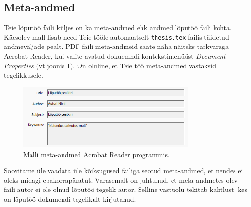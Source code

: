 \subsection{Meta-andmed}
Teie lõputöö faili küljes on ka meta-andmed ehk andmed lõputöö faili kohta. Käesolev mall lisab need Teie tööle automaatselt \verb|thesis.tex| failis täidetud andmeväljade pealt. PDF faili meta-andmeid saate näha näiteks tarkvaraga Acrobat Reader, kui valite avatud dokuemndi kontekstimenüüst \emph{Document Properties} (vt joonis \ref{fig:metaAndmed}). On oluline, et Teie töö meta-andmed vastaksid tegelikkusele.

\begin{figure}[htb!]
    \centering
    \captionsetup{justification=centering}
    \includegraphics[width=0.8\textwidth]{figures/Joonis4-MetaAndmed.png}
    \caption{Malli meta-andmed Acrobat Reader programmis.}
    \label{fig:metaAndmed}
\end{figure}
 
Soovitame üle vaadata üle kõiksugused failiga seotud meta-andmed, et nendes ei oleks midagi ebakorrapäratut. Varasemalt on juhtunud, et meta-andmetes olev faili autor ei ole olnud lõputöö tegelik autor. Selline vastuolu tekitab kahtlust, kes on lõputöö dokumendi tegelikult kirjutanud.
